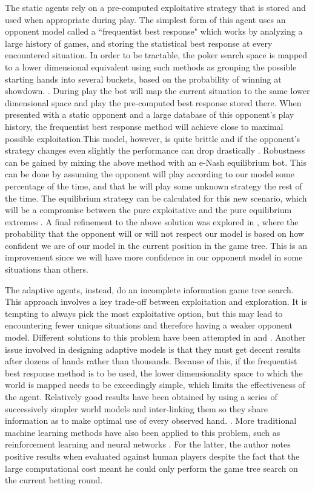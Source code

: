 \documentclass[letterpaper]{article}
\begin{document}
The static agents rely on a pre-computed exploitative strategy that is stored and used when appropriate during play. The simplest form of this agent uses an opponent model called a ``frequentist best response" which works by analyzing a large history of games, and storing the statistical best response at every encountered situation. In order to be tractable, the poker search space is mapped to a lower dimensional equivalent using such methods as grouping the possible starting hands into several buckets, based on the probability of winning at showdown. \cite{P4,P9}. During play the bot will map the current situation to the same lower dimensional space and play the pre-computed best response stored there. When presented with a static opponent and a large database of this opponent's play history, the frequentist best response method will achieve close to maximal possible exploitation.This model, however, is quite brittle and if the opponent's strategy changes even slightly the performance can drop drastically  \cite{P3}. Robustness can be gained by mixing the above method with an e-Nash equilibrium bot. This can be done by assuming the opponent will play according to our model some percentage of the time, and that he will play some unknown strategy the rest of the time. The equilibrium strategy can be calculated for this new scenario, which will be a compromise between the pure exploitative and the pure equilibrium extremes  \cite{P2,P3}. A final refinement to the above solution was explored in  \cite{P5}, where the probability that the opponent will or will not respect our model is based on how confident we are of our model in the current position in the game tree. This is an improvement since we will have more confidence in our opponent model in some situations than others.

The adaptive agents, instead, do an incomplete information game tree search. This approach involves a key trade-off between exploitation and exploration. It is tempting to always pick the most exploitative option, but this may lead to encountering fewer unique situations and therefore having a weaker opponent model. Different solutions to this problem have been attempted in  \cite{P6} and  \cite{P7}. Another issue involved in designing adaptive models is that they must get decent results after dozens of hands rather than thousands. Because of this, if the frequentist best response method is to be used, the lower dimensionality space to which the world is mapped needs to be exceedingly simple, which limits the effectiveness of the agent. Relatively good results have been obtained by using a series of successively simpler world models and inter-linking them so they share information as to make optimal use of every observed hand.  \cite{P6,P8}. More traditional machine learning methods have also been applied to this problem, such as reinforcement learning \cite{P13} and neural networks \cite{P9}. For the latter, the author notes positive results when evaluated against human players despite the fact that the large computational cost meant he could only perform the game tree search on the current betting round.
\end{document}

